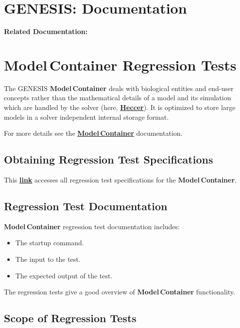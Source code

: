 \documentclass[12pt]{article}
\begin{document}
\section*{GENESIS: Documentation}

{\bf Related Documentation:}

\section*{Model\,Container Regression Tests}

The GENESIS {\bf Model\,Container} deals with biological entities and end-user concepts rather than the mathematical details of a model and its simulation which are handled by the solver (here, \href{../heccer/heccer.tex}{\bf Heccer}). It is optimized to store large models in a solver independent internal storage format.

For more details see the \href{../model-container/model-container.tex}{\bf Model\,Container} documentation.

\subsection*{Obtaining Regression Test Specifications}

This \href{http://www.neurospaces.org/neurospaces_project/neurospaces/tests/html/index.html}{\bf link} accesses all regression test specifications for the {\bf Model\,Container}.

\subsection*{Regression Test Documentation}

{\bf Model\,Container} regression test documentation includes:
\begin{itemize}
\item The startup command.
\item The input to the test.
\item The expected output of the test.
\end{itemize}
The regression tests give a good overview of {\bf Model\,Container} functionality.

\subsection*{Scope of Regression Tests}
\end{document}
